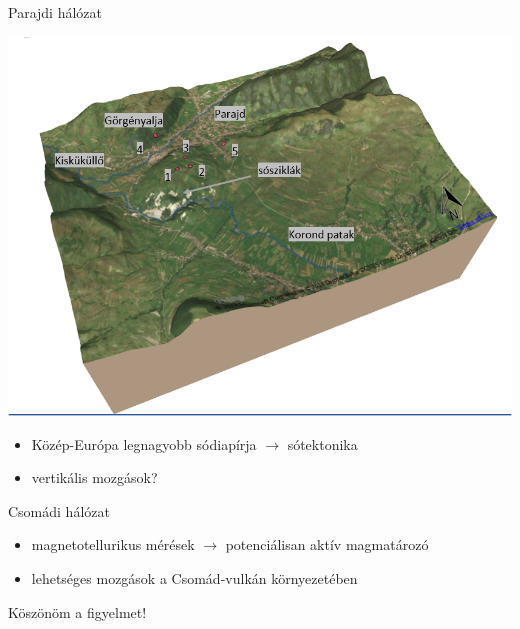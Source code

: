 \documentclass[aspectratio=169]{beamer}
\begin{document}
\begin{frame}{Parajdi hálózat}
    \begin{minipage}[c]{0.7\textwidth}
        \includegraphics[width=\textwidth]{parajd_3D.png}
    \end{minipage}
    \hspace{5pt}
    \begin{minipage}[c]{0.225\textwidth}
        \begin{itemize}
            \item Közép-Európa legnagyobb sódiapírja $\rightarrow$ sótektonika
            \item vertikális mozgások?
        \end{itemize}
    \end{minipage}
\end{frame}


\begin{frame}{Csomádi hálózat}
    \begin{minipage}[c]{0.475\textwidth}
        \centering
        \csomad
    \end{minipage}
    \hspace{5pt}
    \begin{minipage}[c]{0.45\textwidth}
        \begin{itemize}
            \item magnetotellurikus mérések $\rightarrow$ potenciálisan aktív magmatározó
            \item lehetséges mozgások a Csomád-vulkán környezetében
        \end{itemize}
    \end{minipage}
\end{frame}

\begin{frame}
    \begin{center}
        \Huge \color{blue!55!black}
        Köszönöm a figyelmet!
    \end{center}
\end{frame}
\end{document}
